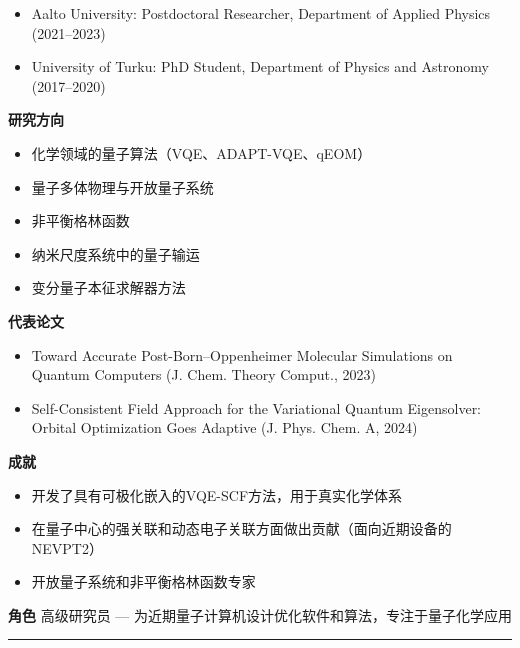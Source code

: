 \begin{itemize}[leftmargin=1.2em,itemsep=0pt,topsep=0pt]
\item {\footnotesize Aalto University: Postdoctoral Researcher, Department of Applied Physics (2021–2023)}
\item {\footnotesize University of Turku: PhD Student, Department of Physics and Astronomy (2017–2020)}
\end{itemize}
\par{\footnotesize\color{mainred}\textbf{研究方向}}
\begin{itemize}[leftmargin=1.2em,itemsep=0pt,topsep=0pt]
\item {\footnotesize 化学领域的量子算法（VQE、ADAPT-VQE、qEOM）}
\item {\footnotesize 量子多体物理与开放量子系统}
\item {\footnotesize 非平衡格林函数}
\item {\footnotesize 纳米尺度系统中的量子输运}
\item {\footnotesize 变分量子本征求解器方法}
\end{itemize}
\par{\footnotesize\color{mainred}\textbf{代表论文}}
\begin{itemize}[leftmargin=1.2em,itemsep=0pt,topsep=0pt]
\item {\footnotesize Toward Accurate Post-Born–Oppenheimer Molecular Simulations on Quantum Computers (J. Chem. Theory Comput., 2023)}
\item {\footnotesize Self-Consistent Field Approach for the Variational Quantum Eigensolver: Orbital Optimization Goes Adaptive (J. Phys. Chem. A, 2024)}
\end{itemize}
\par{\footnotesize\color{mainred}\textbf{成就}}
\begin{itemize}[leftmargin=1.2em,itemsep=0pt,topsep=0pt]
\item {\footnotesize 开发了具有可极化嵌入的VQE-SCF方法，用于真实化学体系}
\item {\footnotesize 在量子中心的强关联和动态电子关联方面做出贡献（面向近期设备的NEVPT2）}
\item {\footnotesize 开放量子系统和非平衡格林函数专家}
\end{itemize}
\par{\footnotesize\color{mainred}\textbf{角色}} {\footnotesize 高级研究员 — 为近期量子计算机设计优化软件和算法，专注于量子化学应用}
\vspace{2pt}\hrule\vspace{2pt}
